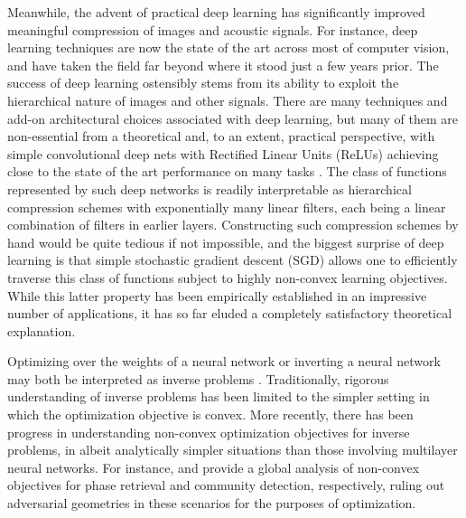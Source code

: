 \documentclass[final,12pt]{colt2018}
\begin{document}
Meanwhile, the advent of practical deep learning has significantly improved meaningful compression of images and acoustic signals. For instance, deep learning techniques are now the state of the art across most of computer vision, and have taken the field far beyond where it stood just a few years prior. The success of deep learning ostensibly stems from its ability to exploit the hierarchical nature of images and other signals. There are many techniques and add-on architectural choices associated with deep learning, but many of them are non-essential from a theoretical and, to an extent, practical perspective, with simple convolutional deep nets with Rectified Linear Units (ReLUs) achieving close to the state of the art performance on many tasks \citep{Simplicity}. The class of functions represented by such deep networks is readily interpretable as hierarchical compression schemes with exponentially many linear filters, each being a linear combination of filters in earlier layers. Constructing such compression schemes by hand would be quite tedious if not impossible, and the biggest surprise of deep learning is that simple stochastic gradient descent (SGD) allows one to efficiently traverse this class of functions subject to highly non-convex learning objectives. While this latter property has been empirically established in an impressive number of applications, it has so far eluded a completely satisfactory theoretical explanation.

Optimizing over the weights of a neural network or inverting a neural network may both be interpreted as inverse problems \citep{Mallat}. Traditionally, rigorous understanding of inverse problems has been limited to the simpler setting in which the optimization objective is convex. More recently, there has been progress in understanding non-convex optimization objectives for inverse problems, in albeit analytically simpler situations than those involving multilayer neural networks. For instance, \cite{WrightPR} and \cite{Burer1} provide a global analysis of non-convex objectives for phase retrieval and community detection, respectively, ruling out adversarial geometries in these scenarios for the purposes of optimization.  %
\end{document}
